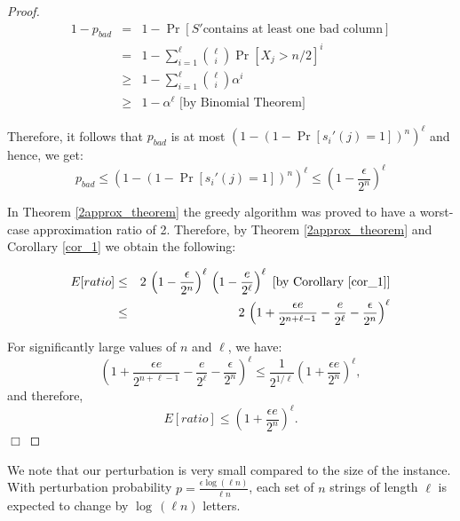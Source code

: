 \begin{proof}
\begin{eqnarray*}
1 - p_{bad} 					& = & 1 - \Pr[S' \mbox{contains at least one bad column}]\\
									& = & 1 - \sum_{i = 1}^{\ell} {\ell \choose i} \Pr[X_j > n/2]^i\\ 
									& \geq & 1 - \sum_{i = 1}^{\ell} {\ell \choose i} \alpha^i\\ 
									& \geq & 1 - \alpha^{\ell} \, \, \mbox{[by Binomial Theorem]}
\end{eqnarray*} 

Therefore, it follows that $p_{bad}$ is at most $\left( 1  - (1 - \Pr[s_i'(j) = 1])^n\right)^{\ell} $ and hence, we get: $$p_{bad} \leq \left( 1  - (1 - \Pr[s_i'(j) = 1])^n\right)^{\ell} \leq \left( 1  - \frac{\epsilon}{2^n} \right)^{\ell}$$

In Theorem \ref{2approx_theorem} the greedy algorithm was proved to have a worst-case approximation ratio of 2.   Therefore, by Theorem \ref{2approx_theorem} and Corollary \ref{cor_1} we obtain the following:

\begin{eqnarray*}
E[ratio]	& \leq & 2 \,  \left( 1  - \frac{\epsilon}{2^n} \right)^{\ell} \, \left( 1 - \frac{e}{2^{\ell}} \right)^{\ell} \mbox{ [by Corollary \ref{cor_1}]} \\
			& \leq & 2 \, \left( 1 + \frac{\epsilon e}{2^{n + \ell - 1}} - \frac{e}{2^{\ell}} - \frac{\epsilon}{2^n} \right)^{\ell}
\end{eqnarray*} 

\noindent For significantly large values of $n$ and $\ell$, we have: $$ \left( 1 + \frac{\epsilon e}{2^{n + \ell - 1}} - \frac{e}{2^{\ell}} - \frac{\epsilon}{2^n} \right)^{\ell} \leq \frac{1}{2^{1/\ell}} \left( 1 + \frac{\epsilon e}{2^{n}} \right)^{\ell}, $$ and therefore, $$ E[ratio] \leq \left( 1 + \frac{\epsilon e}{2^n} \right)^{\ell}.$$ \hfill $\Box$ \end{proof}


We note that our perturbation is very small compared to the size of the instance.  With perturbation probability $p =  \frac{\epsilon \log (\ell n)}{ \ell n}$, each set of $n$ strings of length $\ell$ is expected to change by $\log \, (\ell n )$ letters. 

